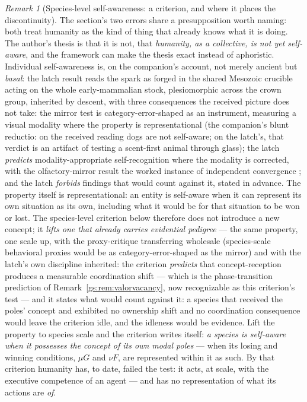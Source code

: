 \documentclass[11pt]{article}
\numberwithin{equation}{section}
\theoremstyle{plain}
\theoremstyle{definition}
\theoremstyle{remark}
\newtheorem{remark}[theorem]{Remark}
\begin{document}
\begin{remark}[Species-level self-awareness: a criterion, and where
it places the discontinuity]\label{hr:rem:speciesaware}
The section's two errors share a presupposition worth naming: both
treat humanity as the kind of thing that already knows what it is
doing. The author's thesis is that it is not, that
\emph{humanity, as a collective, is not yet self-aware}, and the
framework can make the thesis exact instead of aphoristic.
Individual self-awareness is, on the companion's account, not merely
ancient but \emph{basal}: the latch result reads the spark as forged
in the shared Mesozoic crucible acting on the whole early-mammalian
stock, plesiomorphic across the crown group, inherited by descent, with three consequences the received picture does not take: the
mirror test \cite{Gallup70} is category-error-shaped as an
instrument, measuring a visual modality where the property is
representational (the companion's blunt reductio: on the received
reading dogs are not self-aware; on the latch's, that verdict is an
artifact of testing a scent-first animal through glass); the latch
\emph{predicts} modality-appropriate self-recognition where the
modality is corrected, with the olfactory-mirror result the worked
instance of independent convergence \cite{Nexus, Horowitz17}; and
the latch \emph{forbids} findings that would count against it,
stated in advance. The property itself is representational: an
entity is self-aware when it can represent its own situation as its
own, including what it would be for that situation to be won or
lost. The species-level criterion below therefore does not introduce
a new concept; it \emph{lifts one that already carries evidential
pedigree} --- the same property, one scale up, with the
proxy-critique transferring wholesale (species-scale behavioral
proxies would be as category-error-shaped as the mirror) and with
the latch's own discipline inherited: the criterion \emph{predicts}
that concept-reception produces a measurable coordination shift ---
which is the phase-transition prediction of
Remark~\ref{gs:rem:valorvacancy}, now recognizable as this
criterion's test --- and it states what would count against it: a
species that received the poles' concept and exhibited no ownership
shift and no coordination consequence would leave the criterion
idle, and the idleness would be evidence. Lift the property to species scale and
the criterion writes itself: \emph{a species is self-aware when it
possesses the concept of its own modal poles} --- when its losing
and winning conditions, $\mu G$ and $\nu F$, are represented within
it as such. By that criterion humanity has, to date, failed the
test: it acts, at scale, with the executive competence of an agent
--- and has no representation of what its actions are \emph{of}.


\end{remark}
\end{document}
